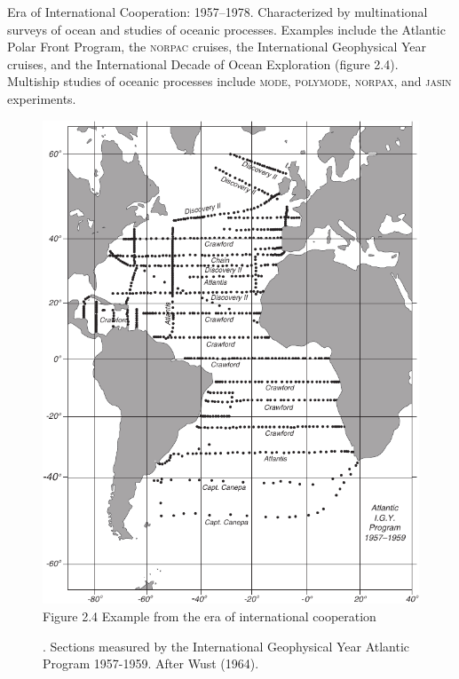 \begin{enumerate}
\begin{figure}[t!]
\label{fig:Fig2-3}
\vspace{-3ex}
\end{figure}

\vitem Era of International Cooperation: 1957--1978. Characterized by
multinational surveys of ocean and studies of oceanic
processes. Examples include the Atlantic Polar Front Program, the
\textsc{norpac} cruises, the International Geophysical Year cruises,
and the International Decade of Ocean Exploration (figure 2.4).
Multiship studies of oceanic processes include \textsc{mode},
\textsc{polymode}, \textsc{norpax}, and \textsc{jasin} experiments.

\begin{figure}[t!]
\includegraphics{pics/Fig2-4}
\centering
\footnotesize
Figure 2.4 Example from the era of international cooperation
\rule{0pt}{3ex}. Sections measured by the International Geophysical
Year Atlantic Program 1957-1959. After Wust (1964).

\label{fig:Fig2-4}
\vspace{-3ex}
\end{figure}


\end{enumerate}
